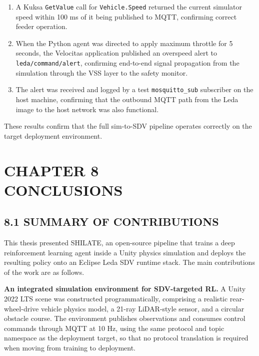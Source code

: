 \documentclass[12pt,a4paper]{article}
\begin{document}
\begin{enumerate}[leftmargin=2.5cm]
  \item A Kuksa \texttt{GetValue} call for \texttt{Vehicle.Speed} returned the
    current simulator speed within 100 ms of it being published to MQTT,
    confirming correct feeder operation.
  \item When the Python agent was directed to apply maximum throttle for
    5 seconds, the Velocitas application published an overspeed alert to
    \texttt{leda/command/alert}, confirming end-to-end signal propagation
    from the simulation through the VSS layer to the safety monitor.
  \item The alert was received and logged by a test \texttt{mosquitto\_sub}
    subscriber on the host machine, confirming that the outbound MQTT path
    from the Leda image to the host network was also functional.
\end{enumerate}

These results confirm that the full sim-to-SDV pipeline operates correctly
on the target deployment environment.

\clearpage

\section*{\centering CHAPTER 8\\[0.3cm] CONCLUSIONS}
\vspace{2\baselineskip}

\subsection*{8.1 \quad SUMMARY OF CONTRIBUTIONS}

\indent This thesis presented SHILATE, an open-source pipeline that trains a deep
reinforcement learning agent inside a Unity physics simulation and deploys the
resulting policy onto an Eclipse Leda SDV runtime stack. The main contributions
of the work are as follows.

\textbf{An integrated simulation environment for SDV-targeted RL.} A Unity
2022 LTS scene was constructed programmatically, comprising a realistic
rear-wheel-drive vehicle physics model, a 21-ray LiDAR-style sensor, and a
circular obstacle course. The environment publishes observations and consumes
control commands through MQTT at 10 Hz, using the same protocol and topic
namespace as the deployment target, so that no protocol translation is
required when moving from training to deployment.
\end{document}
